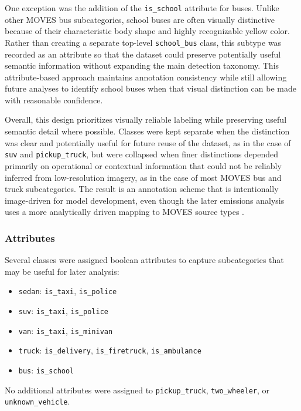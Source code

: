 One exception was the addition of the \verb|is_school| attribute for buses. Unlike 
other MOVES bus subcategories, school buses are often visually distinctive because 
of their characteristic body shape and highly recognizable yellow color. Rather than 
creating a separate top-level \verb|school_bus| class, this subtype was recorded as 
an attribute so that the dataset could preserve potentially useful semantic 
information without expanding the main detection taxonomy. This attribute-based 
approach maintains annotation consistency while still allowing future analyses to 
identify school buses when that visual distinction can be made with reasonable 
confidence.

Overall, this design prioritizes visually reliable labeling while preserving useful 
semantic detail where possible. Classes were kept separate when the distinction was 
clear and potentially useful for future reuse of the dataset, as in the case of 
\verb|suv| and \verb|pickup_truck|, but were collapsed when finer distinctions 
depended primarily on operational or contextual information that could not be 
reliably inferred from low-resolution imagery, as in the case of most MOVES bus and 
truck subcategories. The result is an annotation scheme that is intentionally 
image-driven for model development, even though the later emissions analysis uses a 
more analytically driven mapping to MOVES source types 
\cite{USEPA_def_truck_2019, USEPA_road_pop_2020, us_epa_moves3_2020}.

\subsubsection{Attributes}

Several classes were assigned boolean attributes to capture subcategories that may 
be useful for later analysis:

\begin{itemize}
    \item \verb|sedan|: \verb|is_taxi|, \verb|is_police| 
    \item \verb|suv|: \verb|is_taxi|, \verb|is_police|
    \item \verb|van|: \verb|is_taxi|, \verb|is_minivan| 
    \item \verb|truck|: \verb|is_delivery|, \verb|is_firetruck|, \verb|is_ambulance|
    \item \verb|bus|: \verb|is_school|
\end{itemize}

No additional attributes were assigned to \verb|pickup_truck|, \verb|two_wheeler|, 
or \verb|unknown_vehicle|.

